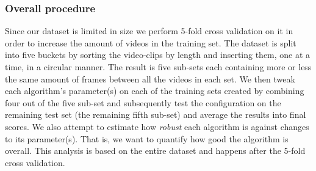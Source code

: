 \documentclass[12pt]{article}
\begin{document}
\subsubsection{Overall procedure}
%
Since our dataset is limited in size we perform 5-fold cross validation on it in order to increase the amount of videos in the training set. The dataset is split into five buckets by sorting the video-clips by length and inserting them, one at a time, in a circular manner. The result is five sub-sets each containing more or less the same amount of frames between all the videos in each set. We then tweak each algorithm's parameter(s) on each of the training sets created by combining four out of the five sub-set and subsequently test the configuration on the remaining test set (the remaining fifth sub-set) and average the results into final scores. We also attempt to estimate how \textit{robust} each algorithm is against changes to its parameter(s). That is, we want to quantify how good the algorithm is overall. This analysis is based on the entire dataset and happens after the 5-fold cross validation.
%
\end{document}
